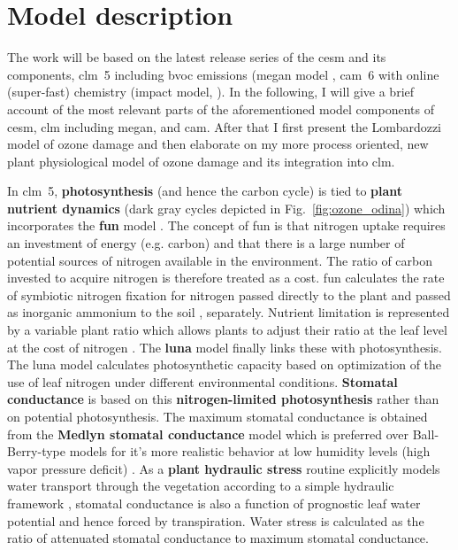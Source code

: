 \section*{Model description}
The work will be based on the latest release series of the \gls{cesm} and its components, \gls{clm}~5 including \gls{bvoc} emissions (\gls{megan} model \parencite{ACP:Guenther2006}, \gls{cam}~6 with online (super-fast) chemistry (\gls{impact} model, \textcite{JGR:Rotman2004}). 
In the following, I will give a brief account of the most relevant parts of the aforementioned model components of \gls{cesm}, \gls{clm} including \gls{megan}, and \gls{cam}. After that I first present the Lombardozzi model of ozone damage and then elaborate on my more process oriented, new plant physiological model of ozone damage and its integration into \gls{clm}.

In \gls{clm}~5, \textbf{photosynthesis} (and hence the carbon cycle) is tied to \textbf{\color{darkgray}plant nutrient dynamics} (dark gray cycles depicted in Fig.~\ref{fig:ozone_odina}) which incorporates the \textbf{\gls{fun}} model \parencites{GBC:Fisher2010}{JGR:Brzostek2014}{GCB:Shi2015}. The concept of \gls{fun} is that nitrogen uptake requires an investment of energy (e.g. carbon) and that there is a large number of potential sources of nitrogen available in the environment. The ratio of carbon invested to acquire nitrogen is therefore treated as a cost. \gls{fun} calculates the rate of symbiotic nitrogen fixation for nitrogen passed directly to the plant and passed as inorganic ammonium to the soil \parencite{GBC:Cleveland1999}, separately. Nutrient limitation is represented by a variable plant  ratio which allows plants to adjust their  ratio at the leaf level at the cost of nitrogen \parencite{JAMES:Ghimire2016}. The \textbf{\gls{luna}} model \parencites{STE:Xu2019}{GMD:Ali2016} finally links these with photosynthesis. The \gls{luna} model calculates photosynthetic capacity based on optimization of the use of leaf nitrogen under different environmental conditions. \textbf{Stomatal conductance} is based on this \textbf{\color{darkgray}nitrogen-limited photosynthesis} rather than on potential photosynthesis. The maximum stomatal conductance is obtained from the \textbf{Medlyn stomatal conductance} model \parencite{GCB:Medlyn2011} which is preferred over Ball-Berry-type models \parencite{BallBerry1987} for it’s more realistic behavior at low humidity levels (high vapor pressure deficit) \parencites{PR:Rogers2013}{NP:Rogers2017}.  
As a \textbf{\color{blue}plant hydraulic stress} routine explicitly models water transport through the vegetation according to a simple hydraulic framework \parencite{JAMES:Kennedy2019}, stomatal conductance is also a function of prognostic leaf water potential and hence forced by transpiration. Water stress is calculated as the ratio of attenuated stomatal conductance to maximum stomatal conductance.

